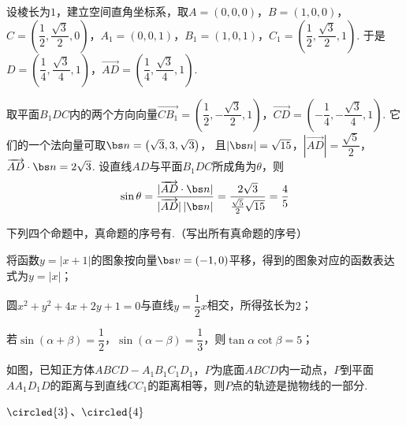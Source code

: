 \begin{solution}
设棱长为\(1\)，建立空间直角坐标系，取\(A=(0,0,0)\)，\(B=(1,0,0)\)，\(C=\left(\dfrac12,\dfrac{\sqrt3}{2},0\right)\)，\(A_1=(0,0,1)\)，\(B_1=(1,0,1)\)，\(C_1=\left(\dfrac12,\dfrac{\sqrt3}{2},1\right)\). 于是\(D=\left(\dfrac14,\dfrac{\sqrt3}{4},1\right)\)，\(\overrightarrow{AD}=\left(\dfrac14,\dfrac{\sqrt3}{4},1\right)\).

取平面\(B_1DC\)内的两个方向向量\(\overrightarrow{CB_1}=\left(\dfrac12,-\dfrac{\sqrt3}{2},1\right)\)，\(\overrightarrow{CD}=\left(-\dfrac14,-\dfrac{\sqrt3}{4},1\right)\). 它们的一个法向量可取\(\bs n=\left(\sqrt3,3,\sqrt3\right)\)，
且\(|\bs n|=\sqrt{15}\)，\(|\overrightarrow{AD}|=\dfrac{\sqrt5}{2}\)，\(\overrightarrow{AD}\cdot\bs n=2\sqrt3\). 设直线\(AD\)与平面\(B_1DC\)所成角为\(\theta\)，则
\[
\sin\theta=\frac{|\overrightarrow{AD}\cdot\bs n|}{|\overrightarrow{AD}|\,|\bs n|}=\frac{2\sqrt3}{\frac{\sqrt5}{2}\sqrt{15}}=\frac45
\]
\end{solution}

\begin{problem}
下列四个命题中，真命题的序号有\fillinblank{}.（写出所有真命题的序号）

\begin{circlelist}
\item 将函数\(y=|x+1|\)的图象按向量\(\bs v=(-1,0)\)平移，得到的图象对应的函数表达式为\(y=|x|\)；
\item 圆\(x^2+y^2+4x+2y+1=0\)与直线\(y=\dfrac12x\)相交，所得弦长为\(2\)；
\item 若\(\sin(\alpha+\beta)=\dfrac12\)，\(\sin(\alpha-\beta)=\dfrac13\)，则\(\tan\alpha\cot\beta=5\)；
\item 如图，已知正方体\(ABCD-A_1B_1C_1D_1\)，\(P\)为底面\(ABCD\)内一动点，\(P\)到平面\(AA_1D_1D\)的距离与到直线\(CC_1\)的距离相等，则\(P\)点的轨迹是抛物线的一部分.
\end{circlelist}

\end{problem}

\begin{answer}
\(\circled{3}\)、\(\circled{4}\)
\end{answer}

